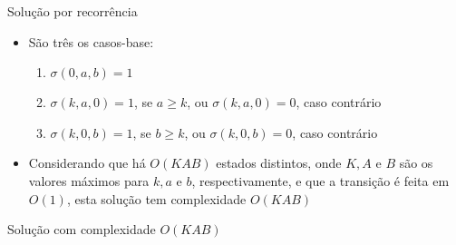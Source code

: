 \begin{frame}[fragile]{Solução por recorrência}

    \begin{itemize}
        \item São três os casos-base:
        \begin{enumerate}
            \item $\sigma(0, a, b) = 1$
            \item $\sigma(k, a, 0) = 1$, se $a \geq k$, ou $\sigma(k, a, 0) = 0$, caso contrário
            \item $\sigma(k, 0, b) = 1$, se $b \geq k$, ou $\sigma(k, 0, b) = 0$, caso contrário
        \end{enumerate}

        \item Considerando que há $O(KAB)$ estados distintos, onde $K, A$ e $B$ são os valores
            máximos para $k, a$ e $b$, respectivamente, e que a transição é feita em $O(1)$, esta
            solução tem complexidade $O(KAB)$
    \end{itemize}

\end{frame}

\begin{frame}[fragile]{Solução com complexidade $O(KAB)$}
\end{frame}
